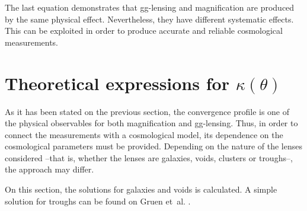 The last equation demonstrates that gg-lensing and magnification are produced by the same physical effect. Nevertheless, they have different systematic effects. This can be exploited in order to produce accurate and reliable cosmological measurements. 

\section{Theoretical expressions for $\kappa(\theta)$}
As it has been stated on the previous section, the convergence profile  is one of the physical observables for both magnification and gg-lensing. Thus, in order to connect the measurements with a cosmological model, its dependence on the cosmological parameters must be provided. Depending on the nature of the lenses considered --that is, whether the lenses are galaxies, voids, clusters or troughs--, the approach may differ.
\newline

On this section, the solutions for galaxies and voids is calculated. A simple solution for troughs can be found on Gruen et~al. \cite{2016MNRAS.455.3367G}.
\newline

